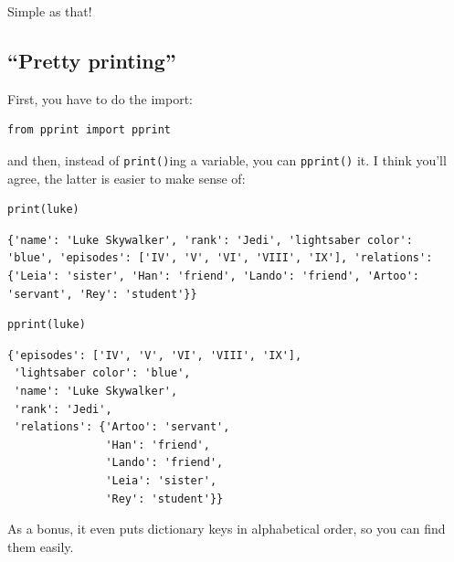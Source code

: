 \normalsize
Simple as that!

\subsection{``Pretty printing''}


First, you have to do the import:

\begin{Verbatim}[fontsize=\small,samepage=true,frame=single,framesep=3mm]
from pprint import pprint
\end{Verbatim}


and then, instead of \texttt{print()}ing a variable, you can \texttt{pprint()}
it. I think you'll agree, the latter is easier to make sense of:

\begin{Verbatim}[fontsize=\small,samepage=true,frame=single,framesep=3mm]
print(luke)
\end{Verbatim}
\vspace{-.2in}

\begin{Verbatim}[fontsize=\small,samepage=true,frame=leftline,framesep=5mm,framerule=1mm]
{'name': 'Luke Skywalker', 'rank': 'Jedi', 'lightsaber color':
'blue', 'episodes': ['IV', 'V', 'VI', 'VIII', 'IX'], 'relations':
{'Leia': 'sister', 'Han': 'friend', 'Lando': 'friend', 'Artoo':
'servant', 'Rey': 'student'}}
\end{Verbatim}

\begin{Verbatim}[fontsize=\small,samepage=true,frame=single,framesep=3mm]
pprint(luke)
\end{Verbatim}
\vspace{-.2in}

\begin{Verbatim}[fontsize=\small,samepage=true,frame=leftline,framesep=5mm,framerule=1mm]
{'episodes': ['IV', 'V', 'VI', 'VIII', 'IX'],
 'lightsaber color': 'blue',
 'name': 'Luke Skywalker',
 'rank': 'Jedi',
 'relations': {'Artoo': 'servant',
               'Han': 'friend',
               'Lando': 'friend',
               'Leia': 'sister',
               'Rey': 'student'}}
\end{Verbatim}

As a bonus, it even puts dictionary keys in alphabetical order, so you can find
them easily.


